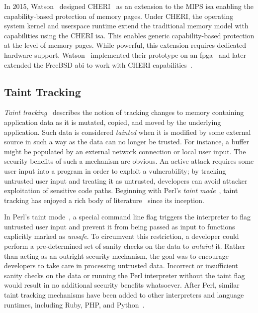 \documentclass[
  fontsize=12pt,
  titlepage=firstiscover,
  paper=letter,
oneside,
  cleardoublepage=plain,
  parskip=half-,
  DIV=10,
  parindent,
  appendixprefix,
  chapterprefix,
  listof=totoc,
]{scrbook}
\begin{document}
In 2015, Watson \etal~designed CHERI~\cite{watson2015_cheri} as an extension to the MIPS
\gls{isa} enabling the capability-based protection of memory pages. Under CHERI, the
operating system kernel and userspace runtime extend the traditional memory model with
capabilities using the CHERI \gls{isa}. This enables generic capability-based protection at
the level of memory pages. While powerful, this extension requires dedicated hardware
support. Watson \etal~implemented their prototype on an \gls{fpga}~\cite{watson2015_cheri}
and later extended the FreeBSD \gls{abi} to work with CHERI capabilities~\cite{davis2019_cheriabi}.



\subsection{Taint Tracking}\label{ss:taint-tracking}

\textit{Taint tracking}~\cite{livshits2012_dynamic} describes the notion of tracking
changes to memory containing application data as it is mutated, copied, and moved by the
underlying application. Such data is considered \textit{tainted} when it is modified by
some external source in such a way as the data can no longer be trusted.  For instance,
a buffer might be populated by an external network connection or local user input. The
security benefits of such a mechanism are obvious. An active attack requires some user
input into a program in order to exploit a vulnerability; by tracking untrusted user input
and treating it as untrusted, developers can avoid attacker exploitation of sensitive code
paths. Beginning with Perl's \textit{taint mode}~\cite{hurst2004_perl}, taint tracking has
enjoyed a rich body of literature~\cite{livshits2012_dynamic, conti2010_taint,
bello2012_taint, ermolinskiy2010_towards, zavou2011_taint, yin2007_panorama,
zhu2011_taint_eraser, cheng2006_taint, clause2007_taint, chin2009_efficient} since its
inception.

In Perl's taint mode~\cite{hurst2004_perl}, a special command line flag triggers the
interpreter to flag untrusted user input and prevent it from being passed as input to
functions explicitly marked as \textit{unsafe}. To circumvent this restriction,
a developer could perform a pre-determined set of sanity checks on the data to
\textit{untaint} it. Rather than acting as an outright security mechanism, the goal was to
encourage developers to take care in processing untrusted data. Incorrect or insufficient
sanity checks on the data or running the Perl interpreter without the taint flag would
result in no additional security benefits whatsoever. After Perl, similar taint tracking
mechanisms have been added to other interpreters and language runtimes, including Ruby,
PHP, and Python~\cite{conti2010_taint}.
\end{document}
